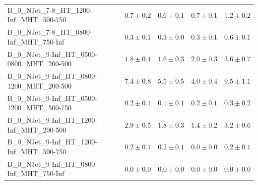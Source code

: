 \documentclass{beamer}
\begin{document}
\begin{frame}
\begin{tabular}{lrrrr}
      B\_0\_NJet\_7-8\_HT\_1200-Inf\_MHT\_500-750 &               $0.7\pm0.2$&              $0.6\pm0.1$&              $0.7\pm0.1$&                   $1.2\pm0.2$ \\
      B\_0\_NJet\_7-8\_HT\_0800-Inf\_MHT\_750-Inf &               $0.3\pm0.1$&              $0.3\pm0.0$&              $0.3\pm0.1$&                   $0.6\pm0.1$ \\
   B\_0\_NJet\_9-Inf\_HT\_0500-0800\_MHT\_200-500 &               $1.8\pm0.4$&              $1.6\pm0.3$&              $2.0\pm0.3$&                   $3.6\pm0.7$ \\
   B\_0\_NJet\_9-Inf\_HT\_0800-1200\_MHT\_200-500 &               $7.4\pm0.8$&              $5.5\pm0.5$&              $4.0\pm0.4$&                   $9.5\pm1.1$ \\
   B\_0\_NJet\_9-Inf\_HT\_0500-1200\_MHT\_500-750 &               $0.2\pm0.1$&              $0.1\pm0.1$&              $0.2\pm0.1$&                   $0.3\pm0.2$ \\
    B\_0\_NJet\_9-Inf\_HT\_1200-Inf\_MHT\_200-500 &               $2.9\pm0.5$&              $1.8\pm0.3$&              $1.4\pm0.2$&                   $3.2\pm0.6$ \\
    B\_0\_NJet\_9-Inf\_HT\_1200-Inf\_MHT\_500-750 &               $0.2\pm0.1$&              $0.2\pm0.1$&              $0.0\pm0.0$&                   $0.2\pm0.1$ \\
    B\_0\_NJet\_9-Inf\_HT\_0800-Inf\_MHT\_750-Inf &               $0.0\pm0.0$&              $0.0\pm0.0$&              $0.0\pm0.0$&                   $0.0\pm0.0$ \\
\bottomrule
\end{tabular}
\end{frame}
\end{document}
